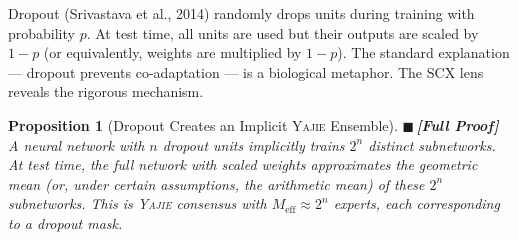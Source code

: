 \documentclass[12pt,a4paper]{article}
\newtheorem{proposition}[theorem]{Proposition}
\theoremstyle{definition}
\newcommand{\rigorFull}{{\color{rigorcolor}$\blacksquare$\,\textbf{[Full Proof]}}}
\newcommand{\Yajie}{\textsc{Yajie}}
\newcommand{\SCX}{\textsc{SCX}}
\begin{document}
Dropout (Srivastava et al., 2014) randomly drops units during training with probability $p$. At test time, all units are used but their outputs are scaled by $1-p$ (or equivalently, weights are multiplied by $1-p$). The standard explanation — dropout prevents co-adaptation — is a biological metaphor. The \SCX{} lens reveals the rigorous mechanism.

\begin{proposition}[Dropout Creates an Implicit \Yajie{} Ensemble]\label{prop:dropout_yajie}
\rigorFull
A neural network with $n$ dropout units implicitly trains $2^n$ distinct subnetworks. At test time, the full network with scaled weights approximates the geometric mean (or, under certain assumptions, the arithmetic mean) of these $2^n$ subnetworks. This is \Yajie{} consensus with $M_{\text{eff}} \approx 2^n$ experts, each corresponding to a dropout mask.
\end{proposition}
\end{document}
